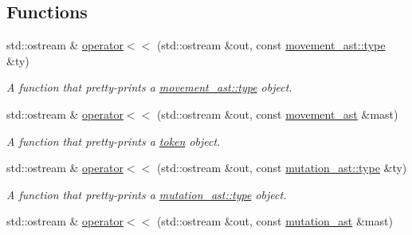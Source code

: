 \subsection*{Functions}
\begin{DoxyCompactItemize}
\item 
\hypertarget{namespacebfjit_ab8c637e2dc36f385821956bc174d4030}{}\label{namespacebfjit_ab8c637e2dc36f385821956bc174d4030} 
std\+::ostream \& \hyperlink{namespacebfjit_ab8c637e2dc36f385821956bc174d4030}{operator$<$$<$} (std\+::ostream \&out, const \hyperlink{classbfjit_1_1movement__ast_a3aa723a03d76c31e1e88be817670701f}{movement\+\_\+ast\+::type} \&ty)
\begin{DoxyCompactList}\small\item\em A function that pretty-\/prints a \hyperlink{classbfjit_1_1movement__ast_a3aa723a03d76c31e1e88be817670701f}{movement\+\_\+ast\+::type} object. \end{DoxyCompactList}\item 
\hypertarget{namespacebfjit_ae08ef2d872d3d9132f0c721fa8489178}{}\label{namespacebfjit_ae08ef2d872d3d9132f0c721fa8489178} 
std\+::ostream \& \hyperlink{namespacebfjit_ae08ef2d872d3d9132f0c721fa8489178}{operator$<$$<$} (std\+::ostream \&out, const \hyperlink{classbfjit_1_1movement__ast}{movement\+\_\+ast} \&mast)
\begin{DoxyCompactList}\small\item\em A function that pretty-\/prints a \hyperlink{classbfjit_1_1token}{token} object. \end{DoxyCompactList}\item 
\hypertarget{namespacebfjit_ae267e9d951306b902f07d1c72413e58d}{}\label{namespacebfjit_ae267e9d951306b902f07d1c72413e58d} 
std\+::ostream \& \hyperlink{namespacebfjit_ae267e9d951306b902f07d1c72413e58d}{operator$<$$<$} (std\+::ostream \&out, const \hyperlink{classbfjit_1_1mutation__ast_a4a35ab616dab7944deedac4300f473e9}{mutation\+\_\+ast\+::type} \&ty)
\begin{DoxyCompactList}\small\item\em A function that pretty-\/prints a \hyperlink{classbfjit_1_1mutation__ast_a4a35ab616dab7944deedac4300f473e9}{mutation\+\_\+ast\+::type} object. \end{DoxyCompactList}\item 
\hypertarget{namespacebfjit_a5cb30f43ec85193cfda8b2169d776527}{}\label{namespacebfjit_a5cb30f43ec85193cfda8b2169d776527} 
std\+::ostream \& \hyperlink{namespacebfjit_a5cb30f43ec85193cfda8b2169d776527}{operator$<$$<$} (std\+::ostream \&out, const \hyperlink{classbfjit_1_1mutation__ast}{mutation\+\_\+ast} \&mast)

\end{DoxyCompactItemize}
